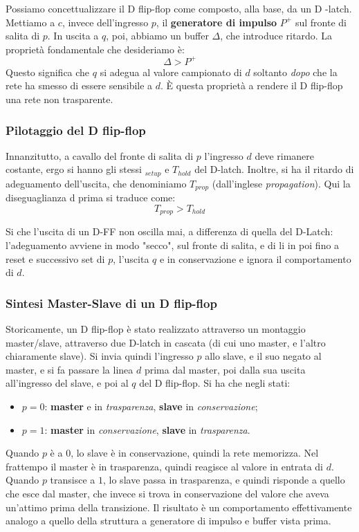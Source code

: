 \documentclass[a4paper,11pt]{article}
\begin{document}
Possiamo concettualizzare il D flip-flop come composto, alla base, da un D -latch.
Mettiamo a $c$, invece dell'ingresso $p$, il \textbf{generatore di impulso} $P^+$ sul fronte di salita di $p$.
In uscita a $q$, poi, abbiamo un buffer $\Delta$, che introduce ritardo.
La proprietà fondamentale che desideriamo è:
$$
\Delta > P^+ 
$$
Questo significa che $q$ si adegua al valore campionato di $d$ soltanto \textit{dopo} che la rete ha smesso di essere sensibile a $d$.
È questa proprietà a rendere il D flip-flop una rete non trasparente.

\subsubsection{Pilotaggio del D flip-flop}
Innanzitutto, a cavallo del fronte di salita di $p$ l'ingresso $d$ deve rimanere costante, ergo si hanno gli stessi $_{setup}$ e $T_{hold}$ del D-latch.
Inoltre, si ha il ritardo di adeguamento dell'uscita, che denominiamo $T_{prop}$ (dall'inglese \textit{propagation}).
Qui la diseguaglianza d prima si traduce come:
$$
T_{prop} > T_{hold}
$$

\par\medskip 

Si che l'uscita di un D-FF non oscilla mai, a differenza di quella del D-Latch: l'adeguamento avviene in modo "secco", sul fronte di salita, e di li in poi fino a reset e successivo set di $p$, l'uscita $q$ e in conservazione e ignora il comportamento di $d$.

\subsubsection{Sintesi Master-Slave di un D flip-flop}
Storicamente, un D flip-flop è stato realizzato attraverso un montaggio master/slave, attraverso due D-latch in cascata (di cui uno master, e l'altro chiaramente slave).
Si invia quindi l'ingresso $p$ allo slave, e il suo negato al master, e si fa passare la linea $d$ prima dal master, poi dalla sua uscita all'ingresso del slave, e poi al $q$ del D flip-flop.
Si ha che negli stati:
\begin{itemize}
	\item $p=0$: \textbf{master} e in \textit{trasparenza}, \textbf{slave} in \textit{conservazione};
	\item $p=1$: \textbf{master} in \textit{conservazione}, \textbf{slave} in \textit{trasparenza}.
\end{itemize}

Quando $p$ è a 0, lo slave è in conservazione, quindi la rete memorizza.
Nel frattempo il master è in trasparenza, quindi reagisce al valore in entrata di $d$.
Quando $p$ transisce a $1$, lo slave passa in trasparenza, e quindi risponde a quello che esce dal master, che invece si trova in conservazione del valore che aveva un'attimo prima della transizione.
Il risultato è un comportamento effettivamente analogo a quello della struttura a generatore di impulso e buffer vista prima.
\end{document}
